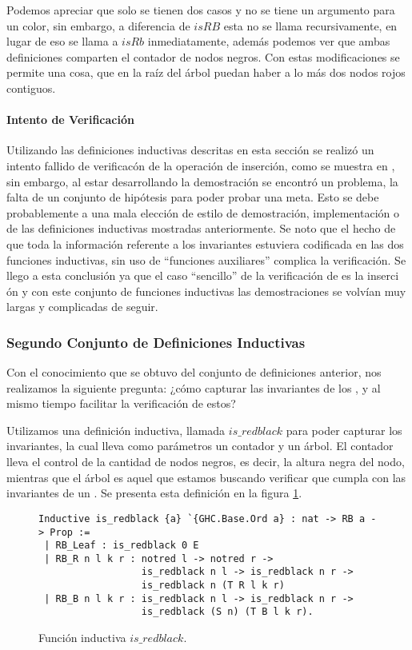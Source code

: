 Podemos apreciar que solo se tienen dos casos y no se tiene un argumento para un color, sin
embargo, a diferencia de $isRB$ esta no se llama recursivamente, en lugar de eso se llama a $isRb$
inmediatamente, además podemos ver que ambas definiciones comparten el contador de nodos negros.
Con estas modificaciones se permite una cosa, que en la ra\'iz del \'arbol puedan haber a lo m\'as
dos nodos rojos contiguos.

\paragraph{Intento de Verificaci\'on}
Utilizando las definiciones inductivas descritas en esta secci\'on se realiz\'o un intento fallido de
verificac\'on de la operaci\'on de inserci\'on, como se muestra en \cite{appel}, sin embargo, al
estar desarrollando la demostraci\'on se encontró un problema, la falta de un conjunto de
hipótesis para poder probar una meta. Esto se debe probablemente a una mala elección de estilo de
demostraci\'on, implementaci\'on o de las definiciones inductivas mostradas anteriormente. Se noto
que el hecho de que toda la informaci\'on referente a los invariantes estuviera codificada en las
dos funciones inductivas, sin uso de ``funciones auxiliares'' complica la verificaci\'on. Se
llego a esta conclusi\'on ya que el caso ``sencillo'' de la verificaci\'on de {\arns} es la inserci
\'on y con este conjunto de funciones inductivas las demostraciones se volvían muy largas y
complicadas de seguir.

\subsubsection{Segundo Conjunto de Definiciones Inductivas}

Con el conocimiento que se obtuvo del conjunto de definiciones anterior, nos realizamos la
siguiente pregunta: ¿c\'omo capturar las invariantes de los {\arns}, y al mismo tiempo facilitar la
verificaci\'on de estos?

Utilizamos una definición inductiva, llamada $is\_redblack$ para poder capturar los invariantes,
la cual lleva como parámetros un contador y un \'arbol. El contador lleva el control de la
cantidad de nodos negros, es decir, la altura negra del nodo, mientras que el \'arbol es aquel que
estamos buscando verificar que cumpla con las invariantes de un {\arn}. Se presenta esta definici\'
on en la figura \ref{inductive_isRedB}.

\begin{figure}[!ht]
\centering
\captionsetup{justification=centering}
\begin{verbatim}
Inductive is_redblack {a} `{GHC.Base.Ord a} : nat -> RB a -> Prop :=
 | RB_Leaf : is_redblack 0 E
 | RB_R n l k r : notred l -> notred r ->
                  is_redblack n l -> is_redblack n r ->
                  is_redblack n (T R l k r)
 | RB_B n l k r : is_redblack n l -> is_redblack n r ->
                  is_redblack (S n) (T B l k r).
\end{verbatim}
\caption{Funci\'on inductiva $is\_redblack$.}
\label{inductive_isRedB}
\end{figure}

